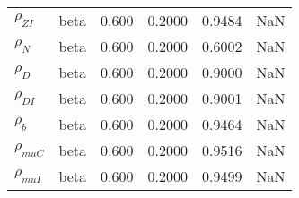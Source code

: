 \begin{center}
\begin{longtable}{llcccc}
${\rho_{ZI}}$ & beta &   0.600 & 0.2000 &   0.9484 &     NaN \\ 
${\rho_N}$ & beta &   0.600 & 0.2000 &   0.6002 &     NaN \\ 
${\rho_D}$ & beta &   0.600 & 0.2000 &   0.9000 &     NaN \\ 
${\rho_{DI}}$ & beta &   0.600 & 0.2000 &   0.9001 &     NaN \\ 
${\rho_b}$ & beta &   0.600 & 0.2000 &   0.9464 &     NaN \\ 
${\rho_{muC}}$ & beta &   0.600 & 0.2000 &   0.9516 &     NaN \\ 
${\rho_{muI}}$ & beta &   0.600 & 0.2000 &   0.9499 &     NaN \\ 
\end{longtable}
 \end{center}
